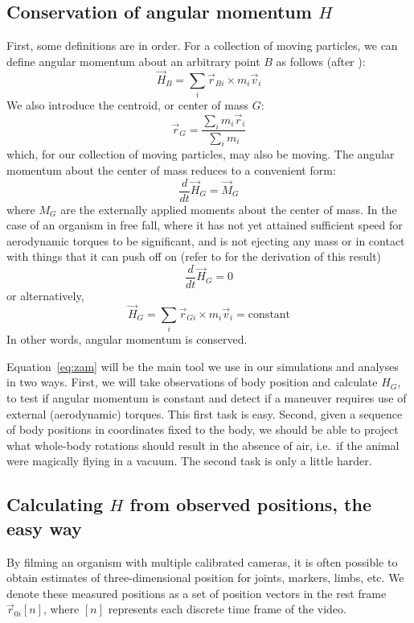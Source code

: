 \subsection{Conservation of angular momentum $H$}
First, some definitions are in order.  For a collection of moving particles, we can define angular momentum about an arbitrary point $B$ as follows (after \cite{Baruh:1999}):
\begin{equation}
\vec{H}_B = \sum_i \vec{r}_{Bi} \times m_i \vec{v}_i
\end{equation}
We also introduce the centroid, or center of mass $G$: 
\begin{equation}
\vec{r}_G = \frac{\sum_i m_i \vec{r}_i}{\sum_i m_i}
\label{eq:COM}
\end{equation}
which, for our collection of moving particles, may also be moving.  The angular momentum about the center of mass reduces to a convenient form:
\begin{equation}
\frac{d}{dt} \vec{H}_G = \vec{M}_G
\end{equation}
where $M_G$ are the externally applied moments about the center of mass. In the case of an organism in free fall, where it has not yet attained sufficient speed for aerodynamic torques to be significant, and is not ejecting any mass or in contact with things that it can push off on (refer to \cite{Baruh:1999} for the derivation of this result) 
\begin{equation}
\frac{d}{dt} \vec{H}_G = 0
\end{equation}
or alternatively,
\begin{equation}
\vec{H}_G = \sum_i \vec{r}_{Gi} \times m_i \vec{v}_i = \mbox{constant}
\label{eq:zam}
\end{equation}
In other words, angular momentum is conserved.  

Equation~\ref{eq:zam} will be the main tool we use in our simulations and analyses in two ways.  First, we will take observations of body position and calculate $H_G$, to test if angular momentum is constant and detect if a maneuver requires use of external (aerodynamic) torques. This first task is easy.  Second, given a sequence of body positions in coordinates fixed to the body, we should be able to project what whole-body rotations should result in the absence of air, i.e.\ if the animal were magically flying in a vacuum.  The second task is only a little harder. 






\subsection{Calculating $H$ from observed positions, the easy way}
\label{sec:forward}
By filming an organism with multiple calibrated cameras, it is often possible to obtain estimates of three-dimensional position for joints, markers, limbs, etc.  We denote these measured positions as a set of position vectors in the rest frame $\vec{r}_{0i}[n]$, where $[n]$ represents each discrete time frame of the video.  

